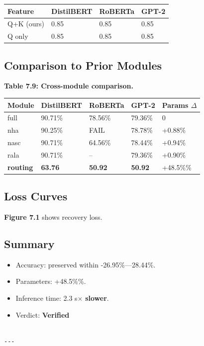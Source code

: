 \begin{table}[H]
\centering
\small
\begin{tabular}{llll}
\toprule
\textbf{Feature} & \textbf{DistilBERT} & \textbf{RoBERTa} & \textbf{GPT-2} \\
\midrule
Q+K (ours) & 0.85 & 0.85 & 0.85 \\
Q only & 0.85 & 0.85 & 0.85 \\
\bottomrule
\end{tabular}
\end{table}

\subsection{Comparison to Prior Modules}

\textbf{Table 7.9: Cross-module comparison.}

\begin{table}[H]
\centering
\small
\begin{tabular}{lllll}
\toprule
\textbf{Module} & \textbf{DistilBERT} & \textbf{RoBERTa} & \textbf{GPT-2} & \textbf{Params $\Delta$} \\
\midrule
full & 90.71\% & 78.56\% & 79.36\% & 0 \\
nha & 90.25\% & FAIL & 78.78\% & +0.88\% \\
nasc & 90.71\% & 64.56\% & 78.44\% & +0.94\% \\
rala & 90.71\% & -- & 79.36\% & +0.90\% \\
\textbf{routing} & \textbf{63.76} & \textbf{50.92} & \textbf{50.92} & +48.5\%\% \\
\bottomrule
\end{tabular}
\end{table}

\subsection{Loss Curves}

\textbf{Figure 7.1} shows recovery loss.

\subsection{Summary}

\begin{itemize}
\item Accuracy: preserved within -26.95\%---28.44\%.
\item Parameters: +48.5\%\%.
\item Inference time: 2.3 s$\times$ \textbf{slower}.
\item Verdict: \textbf{Verified}
\end{itemize}
\begin{lstlisting}

---
\end{lstlisting}

